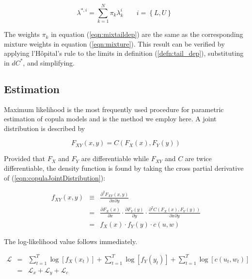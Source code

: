 \documentclass[12pt]{article}
\newcommand{\Lagr}{\mathcal{L}}
\begin{document}
\begin{equation} \label{eqn:mixtaildep}
\lambda^{\ast, i} = \sum_{k=1}^{N}\pi _{k}\lambda_{k}^{i}
\begin{array}{c}
~~~~~~~i = \left\{L,U\right\} 
\end{array}
\end{equation}

The weights $\pi_{k}$ in equation (\ref{eqn:mixtaildep}) are the same as the corresponding mixture weights in equation (\ref{eqn:mixture}). This result can be verified by applying l'H\^{o}pital's rule to the limits in definition (\ref{defn:tail_dep}), substituting in $dC^{\ast}$, and simplifying.

 \subsection{Estimation}

Maximum likelihood is the most frequently used procedure for parametric estimation of copula models and is the method we employ here. A joint distribution is described by

\begin{equation} \label{eqn:copulaJointDistribution}
	F_{XY}\left(x,y\right) = C\left(F_{X}\left(x\right), F_{Y}\left(y\right)\right)
\end{equation}

Provided that $F_{X}$ and $F_{Y}$ are differentiable while $F_{XY}$ and $C$ are twice differentiable, the density function is found by taking the cross partial derivative of (\ref{eqn:copulaJointDistribution}):

\begin{eqnarray*}
f_{XY}\left(x,y\right) &\equiv& \frac{\partial^{2}F_{XY}\left(x,y\right)}{\partial x \partial y} \\
    &=& \frac{\partial F_{X}\left(x\right)}{\partial x} \cdot \frac{\partial F_{Y}\left(y\right)}{\partial y} \cdot \frac{\partial^{2}C\left(F_{X}\left(x\right), F_{Y}\left(y\right)\right)}{\partial x\partial y} \\
    &=& f_{X}\left(x\right) \cdot f_{Y}\left(y\right) \cdot c\left(u,w\right)
\end{eqnarray*}

The log-likelihood value follows immediately.

\begin{eqnarray*}
\Lagr &=& \sum\nolimits_{t=1}^{T}\log \left[f_{X}\left(x_{t}\right)\right] + \sum\nolimits_{t=1}^{T}\log \left[f_{Y}\left(y_{t}\right)\right]
+ \sum\nolimits_{t=1}^{T}\log \left[c\left(u_{t}, w_{t}\right)\right] \\
    &=& \Lagr_{x} + \Lagr_{y} + \Lagr_{c}
\end{eqnarray*}
\end{document}
